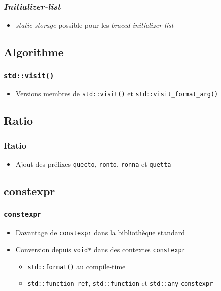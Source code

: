 \documentclass[C++.tex]{subfiles}
\begin{document}
\begin{frame}[fragile]
	\frametitle{\textit{Initializer-list}}
	\begin{itemize}
		\item \textit{static storage} possible pour les \textit{braced-initializer-list}
		
	\end{itemize}
\end{frame}

\subsection*{Algorithme}
\begin{frame}[fragile]
	\frametitle{\lstinline|std::visit()|}
	\begin{itemize}
		\item Versions membres de \lstinline|std::visit()| et \lstinline|std::visit_format_arg()|
	\end{itemize}
\end{frame}

\subsection*{Ratio}
\begin{frame}[fragile]
	\frametitle{Ratio}
	\begin{itemize}
		\item Ajout des préfixes \lstinline|quecto|, \lstinline|ronto|, \lstinline|ronna| et \lstinline|quetta|
	\end{itemize}
\end{frame}

\subsection*{constexpr}
\begin{frame}[fragile]
	\frametitle{\lstinline|constexpr|}
	\begin{itemize}
		\item Davantage de \lstinline|constexpr| dans la bibliothèque standard
		\item Conversion depuis \lstinline|void*| dans des contextes \lstinline|constexpr|
		\begin{itemize}
			\item \lstinline|std::format()| au compile-time
			\item \lstinline|std::function_ref|, \lstinline|std::function| et \lstinline|std::any| \lstinline|constexpr|
		\end{itemize}
	\end{itemize}
\end{frame}
\end{document}
